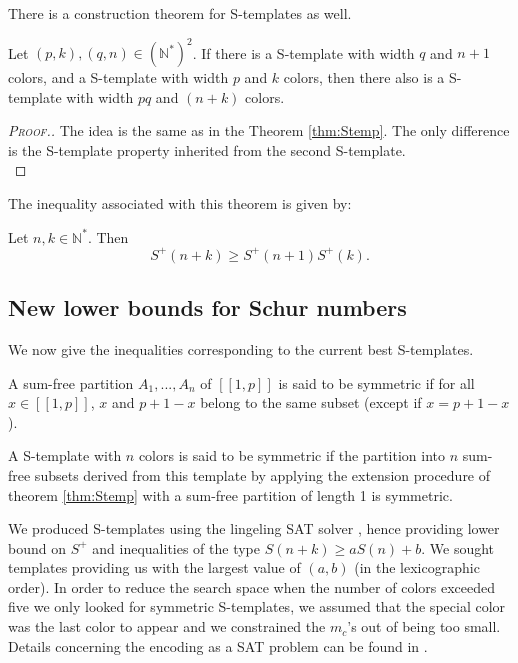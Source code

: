 There is a construction theorem for S-templates as well.

\begin{theorem}
	Let \((p,k), (q,n) \in (\mathbb{N}^*)^2\). If there is a S-template with width \(q\) and \(n+1\) colors,
	and a S-template with width \(p\) and \(k\) colors, then there also is a S-template with width \(pq\) and \((n+k)\) 
	colors.
\end{theorem}

\begin{proof}[\textsc{Proof.}]
The idea is the same as in the Theorem \ref{thm:Stemp}. The only difference is the S-template property inherited 
from the second S-template. \\
\end{proof}
	
The inequality associated with this theorem is given by:
	
\begin{corollary}
	Let \(n, k \in \mathbb{N}^*\). Then
	\[ S^+(n+k) \geqslant S^+(n+1)S^+(k).\]
\end{corollary}


\subsection{New lower bounds for Schur numbers}
\label{subsec:lowS}

We now give the inequalities corresponding to the current  best S-templates.

\begin{definition}
A sum-free partition \(A_1, ..., A_n\) of \([\![1, p]\!]\) is said to be symmetric if for all \( x \in [\![1, p]\!]\), 
\(x\) and \(p + 1 - x\) belong to the same subset (except if \(x = p + 1 - x\)).

A S-template with \(n\) colors is said to be symmetric if the partition into \(n\) sum-free subsets derived 
from this template by applying the extension procedure of theorem \ref{thm:Stemp} with a sum-free partition of length 1 is symmetric. 
\end{definition}

We produced S-templates using the lingeling SAT solver \cite{Lingeling2017}, hence providing lower bound on 
\(S^+\) and inequalities of the type \(S(n+k) \geqslant a S(n) + b\). We sought templates providing us with 
the largest value of \((a, b)\) (in the lexicographic order). In order to reduce the search space when the number 
of colors exceeded five we only looked for symmetric S-templates, we assumed that the special color was the last 
color to appear and we constrained the \(m_c\)'s out of being too small. Details concerning the encoding as a SAT 
problem can be found in \cite{Heule2017}.

